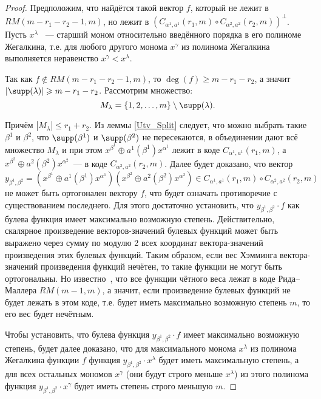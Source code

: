 \begin{proof}
	Предположим, что найдётся такой вектор $f$, который не лежит в $RM(m-r_1-r_2-1,m)$, но лежит в $\left( C_{\alpha^1,a^1}(r_1,m)\circ C_{\alpha^2,a^2}(r_2,m)\right)^{\perp}$.
	Пусть \(x^{\lambda}\) ~--- старший моном относительно введённого порядка в его полиноме Жегалкина, т.е.
	для любого другого монома \(x^{\gamma}\) из полинома Жегалкина выполняется неравенство \(x^{\gamma}<x^{\lambda}\).

	Так как $f \not\in RM(m-r_1-r_2-1,m)$, то $\deg(f)\geqslant m-r_1-r_2$, а значит \(|\supp(\lambda)|\geqslant m - r_1 - r_2\).
	Рассмотрим множество:
	\[
		M_{\lambda} = \{1,2,\ldots,m\}\setminus\supp(\lambda).

	\]

	Причём \(|M_{\lambda}|\leqslant r_1 + r_2\).
	Из леммы \ref{Utv_Split} следует, что можно выбрать такие $\beta^1$ и $\beta^2$, что $\supp(\beta^1)$ и $\supp(\beta^2)$ не пересекаются, в объединении дают всё множество $M_{\lambda}$ и при этом $x^{\beta^1}\oplus a^1(\beta^1)x^{\alpha^1}$ лежит в коде $C_{\alpha^1,a^1}(r_1,m)$, а $x^{\beta^2} \oplus a^2(\beta^2)x^{\alpha^2}$~--- в коде $C_{\alpha^2,a^2}(r_2,m)$.
	Далее будет доказано, что вектор
	\[y_{\beta^1,\beta^2}=(x^{\beta^1}\oplus a^1(\beta^1)x^{\alpha^1})(x^{\beta^2} \oplus a^2(\beta^2)x^{\alpha^2})\in C_{\alpha^1,a^1}(r_1,m)\circ C_{\alpha^2,a^2}(r_2,m)\]
	не может быть ортогонален вектору \(f\), что будет означать противоречие с существованием последнего.
	Для этого достаточно установить, что \(y_{\beta^1,\beta^2}\cdot f\) как булева функция имеет максимально возможную степень.
	Действительно, скалярное произведение векторов-значений булевых функций может быть выражено через сумму по модулю 2 всех координат вектора-значений произведения этих булевых функций.
	Таким образом, если вес Хэмминга вектора-значений произведения функций нечётен, то такие функции не могут быть ортогональны.
	Но известно~\cite{mcwilliams1979theory}, что все функции чётного веса лежат в коде Рида--Маллера \(RM(m-1,m)\), а значит, если произведение булевых функций не будет лежать в этом коде, т.е.
	будет иметь максимально возможную степень \(m\), то его вес будет нечётным.

	Чтобы установить, что булева функция \(y_{\beta^1,\beta^2}\cdot f\) имеет максимально возможную степень, будет далее доказано, что для максимального монома \(x^{\lambda}\) из полинома Жегалкина функции \(f\) функция \(y_{\beta^1,\beta^2}\cdot x^{\lambda}\) будет иметь максимальную степень, а для всех остальных мономов \(x^{\gamma}\) (они будут строго меньше \(x^{\lambda}\)) из этого полинома функция \(y_{\beta^1,\beta^2}\cdot x^{\gamma}\) будет иметь степень строго меньшую \(m\).


\end{proof}
